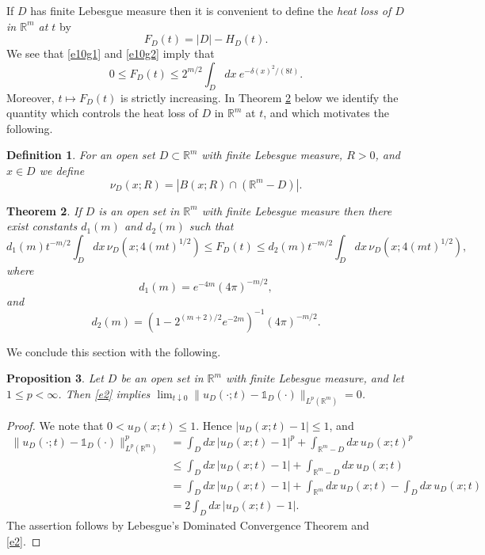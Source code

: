 \documentclass[a4paper,9pt]{amsart}
\newtheorem{theorem}{Theorem}
\newtheorem{definition}[theorem]{Definition}
\newtheorem{proposition}[theorem]{Proposition}
\begin{document}
If $D$ has finite Lebesgue measure then it is convenient to define the {\it heat loss of $D$ in ${\mathbb{R}}^m$ at $t$} by
\begin{equation}\label{e10k}
F_D(t)=|D|-H_D(t).
\end{equation}
We see that \eqref{e10g1} and \eqref{e10g2} imply that
\begin{equation*}
0\le F_D(t)\le 2^{m/2}\int_Ddx\ e^{-\delta(x)^2/(8t)}.
\end{equation*}
Moreover, $t\mapsto F_D(t)$ is strictly increasing.
In Theorem \ref{the3} below we identify the quantity which controls the heat loss of $D$ in ${\mathbb{R}}^m$ at $t$, and which motivates the following.
\begin{definition}\label{def3} For an open set $D \subset {\mathbb{R}}^m$ with finite Lebesgue measure, $R>0$, and
$x\in D$ we define
\begin{equation*}
\nu_D(x;R)=|B(x;R)\cap ({\mathbb{R}}^m-D)|.
\end{equation*}
\end{definition}
\begin{theorem}\label{the3} If $D$ is an open set in ${\mathbb{R}}^m$ with finite Lebesgue measure then there exist constants $d_1(m)$ and $d_2(m)$ such that
\begin{equation}\label{e10n}
d_1(m)t^{-m/2}\int_Ddx \, \nu_D(x;4(mt)^{1/2})\le F_D(t)\le d_2(m)t^{-m/2}\int_Ddx \, \nu_D(x;4(mt)^{1/2}),
\end{equation}
where
\begin{equation*}
d_1(m)=e^{-4m}(4\pi)^{-m/2},
\end{equation*}
and
\begin{equation*}
d_2(m)=\left(1-2^{(m+2)/2}e^{-2m}\right)^{-1}(4\pi)^{-m/2}.
\end{equation*}
\end{theorem}

We conclude this section with the following.
\begin{proposition}\label{L:prop0}
Let $D$ be an open set in ${\mathbb{R}}^{m}$ with finite Lebesgue measure,
and let $1\le p<\infty$. Then \eqref{e2} implies
$\lim_{t\downarrow 0}\lVert u_D(\cdot;t)-
\mathds{1}_{D}(\cdot)\rVert_{L^p({\mathbb{R}}^m)}=0$.
\end{proposition}
\begin{proof} We note that $0<u_D(x;t)\le1$. Hence $|u_D(x;t) - 1|\le 1$, and
\begin{align*}
\lVert u_D(\cdot;t)-
\mathds{1}_{D}(\cdot)\rVert_{L^p({\mathbb{R}}^m)}^p&=\int_{D}dx \,
|u_D(x;t)-1|^p+ \int_{{\mathbb{R}}^{m} - D}dx \, u_D(x;t)^p
\\ & \le \int_Ddx \, |u_D(x;t)-1|+\int_{{\mathbb{R}}^m-D}dx \, u_D(x;t) \\ &
=\int_Ddx \, |u_D(x;t)-1|+\int_{{\mathbb{R}}^m}dx \, u_D(x;t)-\int_Ddx \,
u_D(x;t)
\\& =2\int_Ddx \, |u_D(x;t)-1|.
\end{align*}
The assertion follows by Lebesgue's Dominated Convergence
Theorem and \eqref{e2}.
\end{proof}
\end{document}

